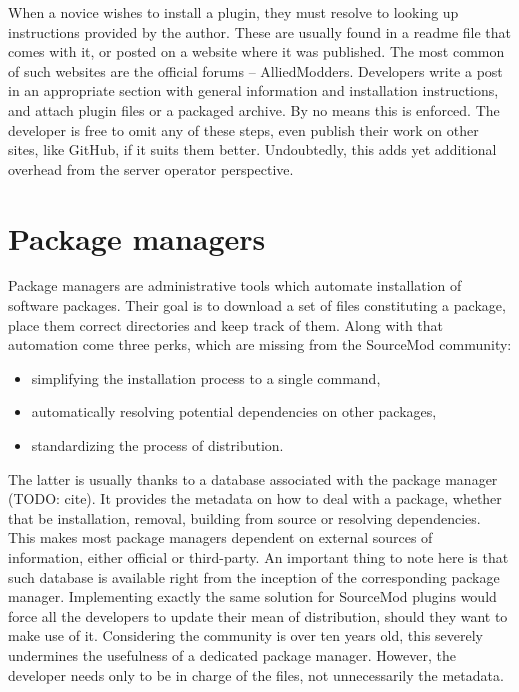 When a novice wishes to install a plugin, they must resolve to looking up instructions provided by the author.
These are usually found in a readme file that comes with it, or posted on a website where it was published.
The most common of such websites are the official forums -- AlliedModders.
Developers write a post in an appropriate section with general information and installation instructions, and attach plugin files or a packaged archive.
By no means this is enforced.
The developer is free to omit any of these steps, even publish their work on other sites, like GitHub, if it suits them better.
Undoubtedly, this adds yet additional overhead from the server operator perspective.

\section{Package managers}

Package managers are administrative tools which automate installation of software packages.
Their goal is to download a set of files constituting a package, place them correct directories and keep track of them.
Along with that automation come three perks, which are missing from the SourceMod community:
\begin{itemize}
    \item simplifying the installation process to a single command,
    \item automatically resolving potential dependencies on other packages,
    \item standardizing the process of distribution.
\end{itemize}

The latter is usually thanks to a database associated with the package manager (TODO: cite).
It provides the metadata on how to deal with a package, whether that be installation, removal, building from source or resolving dependencies.
This makes most package managers dependent on external sources of information, either official or third-party.
An important thing to note here is that such database is available right from the inception of the corresponding package manager.
Implementing exactly the same solution for SourceMod plugins would force all the developers to update their mean of distribution, should they want to make use of it.
Considering the community is over ten years old, this severely undermines the usefulness of a dedicated package manager.
However, the developer needs only to be in charge of the files, not unnecessarily the metadata.
